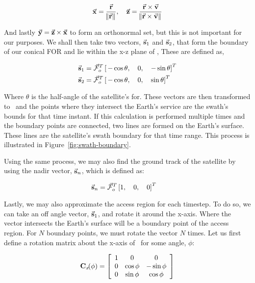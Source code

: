 \begin{equation} 
    \vec{\bm{\mathrm{x}}} = \frac{\vec{\bm{\mathrm{r}}}}{\norm{\vec{\bm{\mathrm{r}}}}}, 
    \quad 
    \vec{\bm{\mathrm{z}}} = \frac{\vec{\bm{\mathrm{r}}}\times\vec{\bm{\mathrm{v}}}}{\norm{\vec{\bm{\mathrm{r}}}\times\vec{\bm{\mathrm{v}}}}}
\end{equation}

And lastly $\vec{\bm{\mathrm{y}}} = \vec{\bm{\mathrm{z}}} \times \vec{\bm{\mathrm{x}}}$ to form an orthonormal set, but
this is not important for our purposes. We shall then take two vectors,
$\vec{\bm{\mathrm{s}}}_{1}$ and $\vec{\bm{\mathrm{s}}}_{2}$, that form the boundary of our conical FOR and
lie within the x-z plane of \Fo,  These are defined as,

\begin{align}
    \vec{\bm{\mathrm{s}}}_{1} &= \vec{\mathcal{F}}_o^T \left[ \, -\cos\theta, \quad 0, \quad -\sin\theta \right]^T \\
    \vec{\bm{\mathrm{s}}}_{2} &= \vec{\mathcal{F}}_o^T \left[ \, -\cos\theta, \quad 0, \quad \sin\theta \right]^T
\end{align}

Where $\theta$ is the half-angle of the satellite’s \gls{for}. These vectors
are then transformed to \Fe~and the points where they intersect the Earth’s
service are the swath’s bounds for that time instant. If this calculation is
performed multiple times and the boundary points are connected, two lines are
formed on the Earth’s surface. These lines are the satellite’s swath boundary
for that time range.  This process is illustrated in
Figure~\ref{fig:swath-boundary}.

Using the same process, we may also find the ground track of the satellite by
using the nadir vector, $\vec{\bm{\mathrm{s}}}_{n}$, which is defined as:

\begin{align}
    \vec{\bm{\mathrm{s}}}_{n} &= \vec{\mathcal{F}}_o^T \left[ 1, \quad 0, \quad 0 \right]^T
\end{align}

\newcommand{\Cx}[1]{\ses{C}{x}\!\!\left(#1 \right)}

Lastly, we may also approximate the access region for each timestep. To do so,
we can take an off angle vector, $\vec{\bm{\mathrm{s}}}_{1}$, and rotate it around the
x-axis. Where the vector intersects the Earth's surface will be a boundary
point of the access region. For $N$ boundary points, we must rotate the vector
$N$ times. Let us first define a rotation matrix about the x-axis of \Fo~for
some angle, $\phi$:

\begin{equation}
    \Cx{\phi} = 
    \left[
	\begin{array}{ccc}
	1  & 0 & 0   \\
	0 & \cos\phi  & -\sin\phi   \\
	0 & \sin\phi  & \cos\phi
    \end{array}
    \right]
\end{equation}

